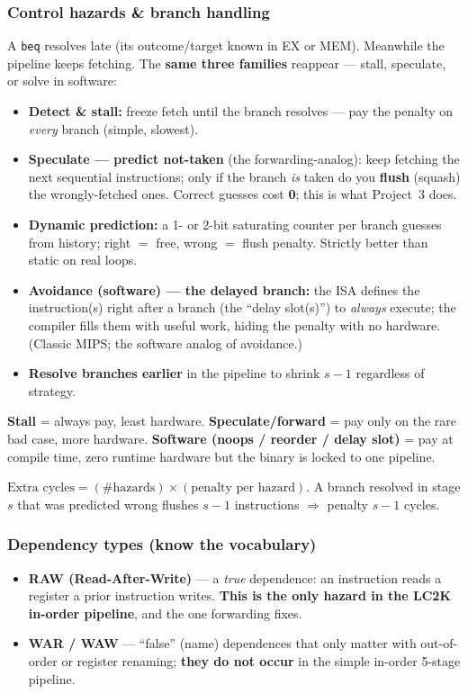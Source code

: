 \documentclass[10pt]{article}
\newcommand{\code}[1]{\texttt{\small #1}}
\begin{document}
\subsubsection{Control hazards \& branch handling}
A \code{beq} resolves late (its outcome/target known in EX or MEM). Meanwhile the pipeline keeps
fetching. The \textbf{same three families} reappear --- stall, speculate, or solve in software:
\begin{itemize}
\item \textbf{Detect \& stall:} freeze fetch until the branch resolves --- pay the penalty on
\emph{every} branch (simple, slowest).
\item \textbf{Speculate --- predict not-taken} (the forwarding-analog): keep fetching the next
sequential instructions; only if the branch \emph{is} taken do you \textbf{flush} (squash) the
wrongly-fetched ones. Correct guesses cost \textbf{0}; this is what Project~3 does.
\item \textbf{Dynamic prediction:} a 1- or 2-bit saturating counter per branch guesses from
history; right $=$ free, wrong $=$ flush penalty. Strictly better than static on real loops.
\item \textbf{Avoidance (software) --- the delayed branch:} the ISA defines the instruction(s)
right after a branch (the ``delay slot(s)'') to \emph{always} execute; the compiler fills them with
useful work, hiding the penalty with no hardware. (Classic MIPS; the software analog of avoidance.)
\item \textbf{Resolve branches earlier} in the pipeline to shrink $s-1$ regardless of strategy.
\end{itemize}
\begin{tipbox}
\textbf{Stall} = always pay, least hardware. \textbf{Speculate/forward} = pay only on the rare bad
case, more hardware. \textbf{Software (noops / reorder / delay slot)} = pay at compile time, zero
runtime hardware but the binary is locked to one pipeline.
\end{tipbox}

\begin{formbox}
$\text{Extra cycles} = (\text{\# hazards}) \times (\text{penalty per hazard})$. A branch resolved in
stage $s$ that was predicted wrong flushes $s-1$ instructions $\Rightarrow$ penalty $s-1$ cycles.
\end{formbox}

\subsubsection{Dependency types (know the vocabulary)}
\begin{itemize}
\item \textbf{RAW (Read-After-Write)} --- a \emph{true} dependence: an instruction reads a register a
prior instruction writes. \textbf{This is the only hazard in the LC2K in-order pipeline}, and the one
forwarding fixes.
\item \textbf{WAR / WAW} --- ``false'' (name) dependences that only matter with out-of-order or
register renaming; \textbf{they do not occur} in the simple in-order 5-stage pipeline.
\end{itemize}
\end{document}
